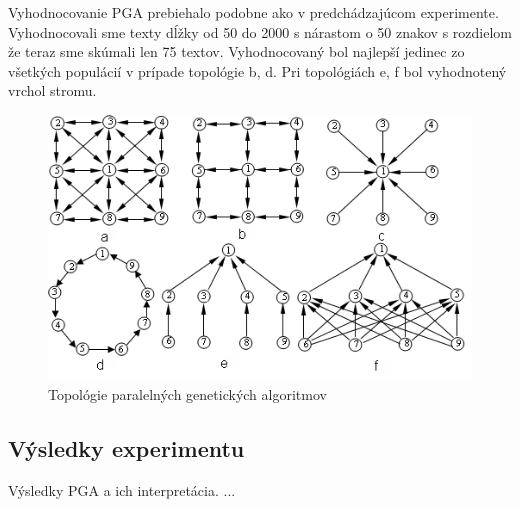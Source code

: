 Vyhodnocovanie PGA prebiehalo podobne ako v predchádzajúcom experimente. Vyhodnocovali sme texty dĺžky od 50 do 2000 s nárastom o 50 znakov s rozdielom že teraz sme skúmali len 75 textov. Vyhodnocovaný bol najlepší jedinec zo všetkých populácií v prípade topológie b, d. Pri topológiách e, f bol vyhodnotený vrchol stromu. 
\begin{figure}[!htbp]
  \centering
  \includegraphics[width=\textwidth]{img/topology.png}
  \caption{Topológie paralelných genetických algoritmov}
  \label{img:topology}
\end{figure}

\clearpage
\subsection{Výsledky experimentu}
Výsledky PGA a ich interpretácia.
...


